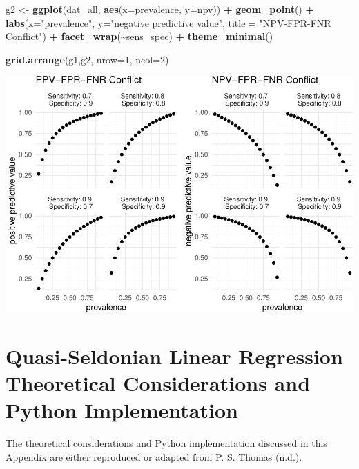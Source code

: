 \documentclass[12pt, twoside]{amherstthesis}
\newenvironment{Shaded}{\begin{snugshade}}{\end{snugshade}}
\newcommand{\AttributeTok}[1]{\textcolor[rgb]{0.13,0.29,0.53}{#1}}
\newcommand{\DecValTok}[1]{\textcolor[rgb]{0.00,0.00,0.81}{#1}}
\newcommand{\FunctionTok}[1]{\textcolor[rgb]{0.13,0.29,0.53}{\textbf{#1}}}
\newcommand{\NormalTok}[1]{#1}
\newcommand{\OtherTok}[1]{\textcolor[rgb]{0.56,0.35,0.01}{#1}}
\newcommand{\SpecialCharTok}[1]{\textcolor[rgb]{0.81,0.36,0.00}{\textbf{#1}}}
\newcommand{\StringTok}[1]{\textcolor[rgb]{0.31,0.60,0.02}{#1}}
\begin{document}
\begin{Shaded}
\begin{Highlighting}[]
\NormalTok{g2 }\OtherTok{\textless{}{-}} \FunctionTok{ggplot}\NormalTok{(dat\_all, }\FunctionTok{aes}\NormalTok{(}\AttributeTok{x=}\NormalTok{prevalence, }\AttributeTok{y=}\NormalTok{npv)) }\SpecialCharTok{+}
        \FunctionTok{geom\_point}\NormalTok{() }\SpecialCharTok{+} 
        \FunctionTok{labs}\NormalTok{(}\AttributeTok{x=}\StringTok{"prevalence"}\NormalTok{, }\AttributeTok{y=}\StringTok{"negative predictive value"}\NormalTok{,}
             \AttributeTok{title =} \StringTok{"NPV{-}FPR{-}FNR Conflict"}\NormalTok{) }\SpecialCharTok{+}
        \FunctionTok{facet\_wrap}\NormalTok{(}\SpecialCharTok{\textasciitilde{}}\NormalTok{sens\_spec) }\SpecialCharTok{+}
  \FunctionTok{theme\_minimal}\NormalTok{()}

\FunctionTok{grid.arrange}\NormalTok{(g1,g2, }\AttributeTok{nrow=}\DecValTok{1}\NormalTok{, }\AttributeTok{ncol=}\DecValTok{2}\NormalTok{)}
\end{Highlighting}
\end{Shaded}
\begin{center}\includegraphics{Dasha-Asienga_StatThesis_files/figure-latex/unnamed-chunk-52-1} \end{center}

\hypertarget{appendix-b}{%
\chapter{Quasi-Seldonian Linear Regression Theoretical Considerations and Python Implementation}\label{appendix-b}}

The theoretical considerations and Python implementation discussed in this Appendix are either reproduced or adapted from P. S. Thomas (n.d.).
\end{document}
